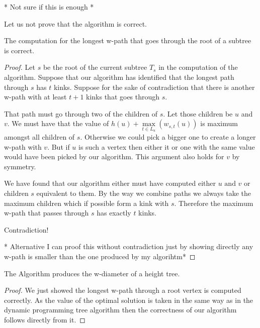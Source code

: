 
* Not sure if this is enough *

Let us not prove that the algorithm is correct. 

\begin{lem} The computation for the longest w-path that goes through the root of a subtree is correct. \end{lem}
\begin{proof}
    Let $s$ be the root of the current subtree $T_s$ in the computation of the algorithm. Suppose that our algorithm has identified that the longest path through $s$ has $t$ kinks. Suppose for the sake of contradiction that there is another w-path with at least $t+1$ kinks that goes through $s$.

    That path must go through two of the children of $s$. Let those children be $u$ and $v$. We must have that the value of $h(u) + \max\limits_{t \in L_u}(w_{s, t}(u))$ is maximum amongst all children of $s$. Otherwise we could pick a bigger one to create a longer w-path with $v$. But if $u$ is such a vertex then either it or one with the same value would have been picked by our algorithm. This argument also holds for $v$ by symmetry.

    We have found that our algorithm either must have computed either $u \text{ and } v$ or children $s$ equivalent to them. By the way we combine paths we always take the maximum children which if possible form a kink with $s$. Therefore the maximum w-path that passes through $s$ has exactly $t$ kinks.

    Contradiction!

    * Alternative I can proof this without contradiction just by showing directly any w-path is smaller than the one produced by my algorihtm*

\end{proof}


\begin{lem} The Algorithm produces the w-diameter of a height tree. \end{lem}

\begin{proof}

    We just showed the longest w-path through a root vertex is computed correctly. As the value of the optimal solution is taken in the same way as in the dynamic programming tree algorithm then the correctness of our algorithm follows directly from it.

\end{proof}


